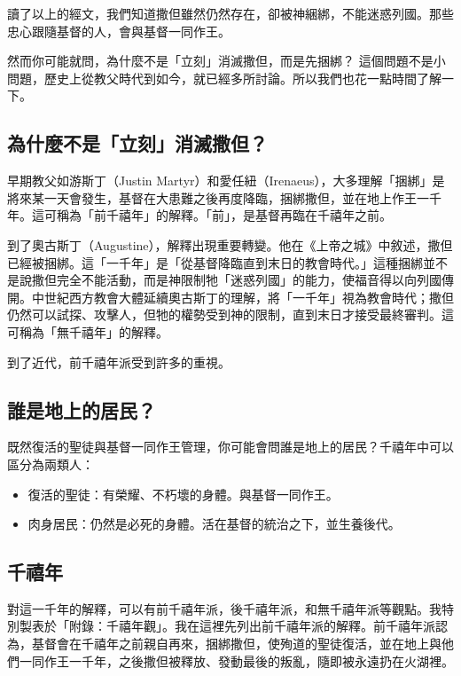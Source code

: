 讀了以上的經文，我們知道撒但雖然仍然存在，卻被神綑綁，不能迷惑列國。那些忠心跟隨基督的人，會與基督一同作王。

然而你可能就問，為什麼不是「立刻」消滅撒但，而是先捆綁？%
這個問題不是小問題，歷史上從教父時代到如今，就已經多所討論。所以我們也花一點時間了解一下。

\subsection{為什麼不是「立刻」消滅撒但？}

早期教父如游斯丁（Justin Martyr）和愛任紐（Irenaeus），大多理解「捆綁」是將來某一天會發生，基督在大患難之後再度降臨，捆綁撒但，並在地上作王一千年。這可稱為「前千禧年」的解釋。「前」，是基督再臨在千禧年之前。

到了奧古斯丁（Augustine），解釋出現重要轉變。他在《上帝之城》中敘述，撒但已經被捆綁。這「一千年」是「從基督降臨直到末日的教會時代。」這種捆綁並不是說撒但完全不能活動，而是神限制牠「迷惑列國」的能力，使福音得以向列國傳開。中世紀西方教會大體延續奧古斯丁的理解，將「一千年」視為教會時代；撒但仍然可以試探、攻擊人，但牠的權勢受到神的限制，直到末日才接受最終審判。這可稱為「無千禧年」的解釋。

到了近代，前千禧年派受到許多的重視。


\subsection{誰是地上的居民？}

既然復活的聖徒與基督一同作王管理，你可能會問誰是地上的居民？千禧年中可以區分為兩類人：
\begin{itemize}
\item 復活的聖徒：有榮耀、不朽壞的身體。與基督一同作王。
\item 肉身居民：仍然是必死的身體。活在基督的統治之下，並生養後代。
\end{itemize}


\subsection{千禧年}

對這一千年的解釋，可以有前千禧年派，後千禧年派，和無千禧年派等觀點。我特別製表於「附錄：千禧年觀」。我在這裡先列出前千禧年派的解釋。前千禧年派認為，基督會在千禧年之前親自再來，捆綁撒但，使殉道的聖徒復活，並在地上與他們一同作王一千年，之後撒但被釋放、發動最後的叛亂，隨即被永遠扔在火湖裡。

